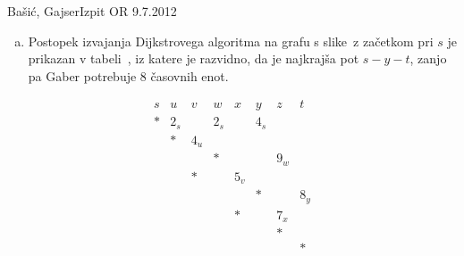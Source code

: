 \begin{naloga}{Bašić, Gajser}{Izpit OR 9.7.2012}
\begin{odgovor}
\begin{enumerate}[(a)]
\item Postopek izvajanja Dijkstrovega algoritma
na grafu s slike~ z začetkom pri $s$
je prikazan v tabeli~\tab,
iz katere je razvidno, da je najkrajša pot $s - y - t$,
zanjo pa Gaber potrebuje $8$ časovnih enot.
\end{enumerate}
%
\begin{slika}
\end{slika}
%
\begin{tabela}[h]
$$
\begin{array}{cccccccc}
s & u & v & w & x & y & z & t \\ \hline
* & 2_s && 2_s && 4_s && \\
& * & 4_u &&&&& \\
&&& * &&& 9_w & \\
&& * && 5_v &&& \\
&&&&& * && 8_y \\
&&&& * && 7_x & \\
&&&&&& * & \\
&&&&&&& *
\end{array}
$$
\end{tabela}
\end{odgovor}
\end{naloga}

